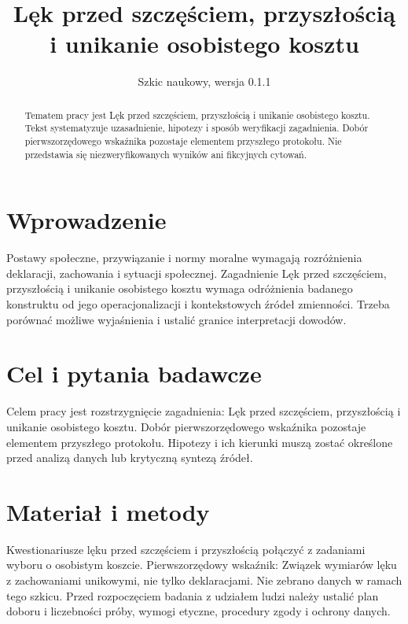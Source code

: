 \documentclass[11pt,a4paper]{article}
\title{Lęk przed szczęściem, przyszłością i unikanie osobistego kosztu}
\author{}
\date{Szkic naukowy, wersja 0.1.1}
\begin{document}
\maketitle

\begin{abstract}

Tematem pracy jest Lęk przed szczęściem, przyszłością i unikanie osobistego kosztu. Tekst systematyzuje uzasadnienie, hipotezy i sposób weryfikacji zagadnienia. Dobór pierwszorzędowego wskaźnika pozostaje elementem przyszłego protokołu. Nie przedstawia się niezweryfikowanych wyników ani fikcyjnych cytowań.

\end{abstract}

\section{Wprowadzenie}

Postawy społeczne, przywiązanie i normy moralne wymagają rozróżnienia deklaracji, zachowania i sytuacji społecznej. Zagadnienie Lęk przed szczęściem, przyszłością i unikanie osobistego kosztu wymaga odróżnienia badanego konstruktu od jego operacjonalizacji i kontekstowych źródeł zmienności. Trzeba porównać możliwe wyjaśnienia i ustalić granice interpretacji dowodów.

\section{Cel i pytania badawcze}

Celem pracy jest rozstrzygnięcie zagadnienia: Lęk przed szczęściem, przyszłością i unikanie osobistego kosztu. Dobór pierwszorzędowego wskaźnika pozostaje elementem przyszłego protokołu. Hipotezy i ich kierunki muszą zostać określone przed analizą danych lub krytyczną syntezą źródeł.

\section{Materiał i metody}

Kwestionariusze lęku przed szczęściem i przyszłością połączyć z zadaniami wyboru o osobistym koszcie. Pierwszorzędowy wskaźnik: Związek wymiarów lęku z zachowaniami unikowymi, nie tylko deklaracjami. Nie zebrano danych w ramach tego szkicu. Przed rozpoczęciem badania z udziałem ludzi należy ustalić plan doboru i liczebności próby, wymogi etyczne, procedury zgody i ochrony danych.
\end{document}
